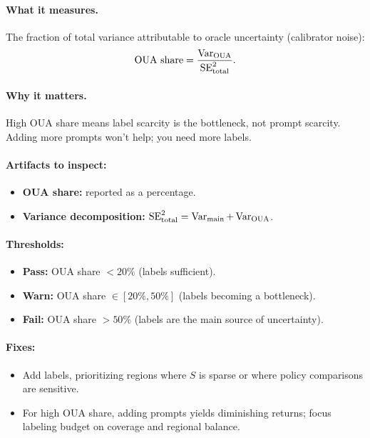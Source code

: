 \paragraph{What it measures.} The fraction of total variance attributable to oracle uncertainty (calibrator noise):
\begin{equation}
\text{OUA share} = \frac{\operatorname{Var}_{\text{OUA}}}{\operatorname{SE}^2_{\text{total}}}.
\end{equation}

\paragraph{Why it matters.} High OUA share means label scarcity is the bottleneck, not prompt scarcity. Adding more prompts won't help; you need more labels.

\paragraph{Artifacts to inspect:}
\begin{itemize}
\item \textbf{OUA share:} reported as a percentage.
\item \textbf{Variance decomposition:} $\operatorname{SE}^2_{\text{total}} = \operatorname{Var}_{\text{main}} + \operatorname{Var}_{\text{OUA}}$.
\end{itemize}

\paragraph{Thresholds:}
\begin{itemize}
\item \textbf{Pass:} OUA share $< 20\%$ (labels sufficient).
\item \textbf{Warn:} OUA share $\in [20\%, 50\%]$ (labels becoming a bottleneck).
\item \textbf{Fail:} OUA share $> 50\%$ (labels are the main source of uncertainty).
\end{itemize}

\paragraph{Fixes:}
\begin{itemize}
\item Add labels, prioritizing regions where $S$ is sparse or where policy comparisons are sensitive.
\item For high OUA share, adding prompts yields diminishing returns; focus labeling budget on coverage and regional balance.
\end{itemize}

